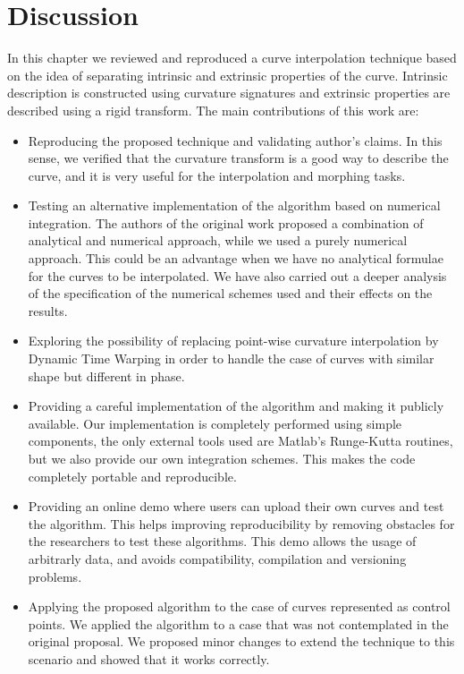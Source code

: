 \documentclass{ipol}
\begin{document}
\clearpage
\section{Discussion}\label{sec:curve_interpolation:discussion}

In this chapter we reviewed and reproduced a curve interpolation technique based on the idea of separating intrinsic and extrinsic properties of the curve. Intrinsic description is constructed using curvature signatures and extrinsic properties are described using a rigid transform.
The main contributions of this work are:
\begin{itemize}
	\item Reproducing the proposed technique and validating author's claims. In this sense, we verified that the curvature transform is a good way to describe the curve, and it is very useful for the interpolation and morphing tasks.
	\item Testing an alternative implementation of the algorithm based on numerical integration. The authors of the original work proposed a combination of analytical and numerical approach, while we used a purely numerical approach. This could be an advantage when we have no analytical formulae for the curves to be interpolated.
	We have also carried out a deeper analysis of the specification of the numerical schemes used and their effects on the results. 
	\item Exploring the possibility of replacing point-wise curvature interpolation by Dynamic Time Warping in order to handle the case of curves with similar shape but different in phase.
	\item Providing a careful implementation of the algorithm and making it publicly available. Our implementation is completely performed using simple components, the only external tools used are Matlab's Runge-Kutta routines, but we also provide our own integration schemes. This makes the code completely portable and reproducible.
	\item Providing an online demo where users can upload their own curves and test the algorithm. This helps improving reproducibility by removing obstacles for the researchers to test these algorithms. This demo allows the usage of arbitrarly data, and avoids compatibility, compilation and versioning problems.
	\item Applying the proposed algorithm to the case of curves represented as control points. We applied the algorithm to a case that was not contemplated in the original proposal. We proposed minor changes to extend the technique to this scenario and showed that it works correctly.
\end{itemize}
\end{document}
